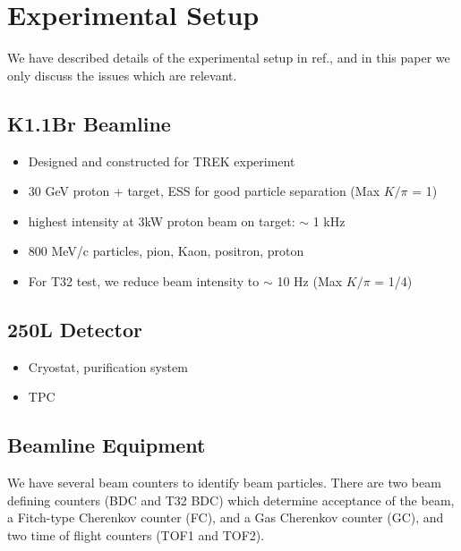 \section{Experimental Setup}

We have described details of the experimental setup in ref.\cite{Araoka:2011pw},
and in this paper we only discuss the issues which are relevant.

\subsection{K1.1Br Beamline}
\begin{itemize}
\item Designed and constructed for TREK experiment
\item 30 GeV proton + target, ESS for good particle separation (Max $K/\pi$ = 1)
\item highest intensity at 3kW proton beam on target: $\sim$ 1 kHz 
\item 800 MeV/c particles, pion, Kaon, positron, proton
\item For T32 test, we reduce beam intensity to $\sim$ 10 Hz (Max $K/\pi$ = 1/4)
\end{itemize}

\subsection{250L Detector}
\begin{itemize}
\item Cryostat, purification system
\item TPC
\end{itemize}

\subsection{Beamline Equipment}

We have several beam counters to identify beam particles.
There are two beam defining counters (BDC and T32 BDC) which determine acceptance of the beam, 
a Fitch-type Cherenkov counter (FC), 
and a Gas Cherenkov counter (GC), 
and two time of flight counters (TOF1 and TOF2).


